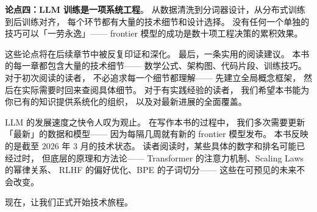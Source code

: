 \textbf{论点四：LLM 训练是一项系统工程}。
从数据清洗到分词器设计，从分布式训练到后训练对齐，
每个环节都有大量的技术细节和设计选择。
没有任何一个单独的技巧可以「一劳永逸」——
frontier 模型的成功是数十项工程决策的累积效果。

这些论点将在后续章节中被反复印证和深化。
最后，一条实用的阅读建议。
本书的每一章都包含大量的技术细节——
数学公式、架构图、代码片段、训练技巧。
对于初次阅读的读者，
不必追求每一个细节都理解——
先建立全局概念框架，
然后在实际需要时回来查阅具体细节。
对于有实践经验的读者，
我们希望本书能为你已有的知识提供系统化的组织，
以及对最新进展的全面覆盖。

LLM 的发展速度之快令人叹为观止。
在写作本书的过程中，
我们多次需要更新「最新」的数据和模型——
因为每隔几周就有新的 frontier 模型发布。
本书反映的是截至 2026 年 3 月的技术状态。
读者阅读时，某些具体的数字和排名可能已经过时，
但底层的原理和方法论——
Transformer 的注意力机制、Scaling Laws 的幂律关系、
RLHF 的偏好优化、BPE 的子词切分——
这些在可预见的未来不会改变。

现在，让我们正式开始技术旅程。


